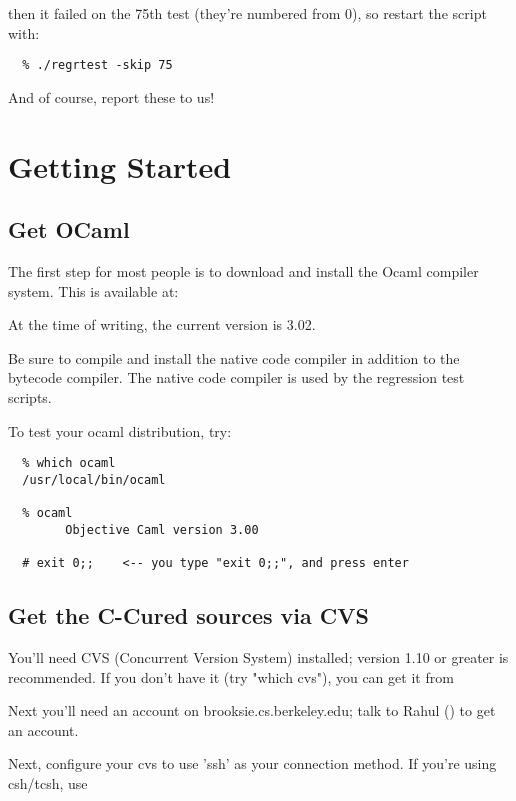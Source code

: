\documentclass{book}
\begin{document}
then it failed on the 75th test (they're numbered from 0), so restart
the script with:

\begin{verbatim}
  % ./regrtest -skip 75
\end{verbatim}

And of course, report these to us!

        \chapter{Getting Started}

\section{Get OCaml}

The first step for most people is to download and install the Ocaml
compiler system.  This is available at:


At the time of writing, the current version is 3.02.

Be sure to compile and install the native code compiler in addition
to the bytecode compiler.  The native code compiler is used by the
regression test scripts.

To test your ocaml distribution, try:

\begin{verbatim}
  % which ocaml
  /usr/local/bin/ocaml

  % ocaml
        Objective Caml version 3.00

  # exit 0;;    <-- you type "exit 0;;", and press enter
\end{verbatim}

\section{Get the C-Cured sources via CVS}

You'll need CVS (Concurrent Version System) installed; version 1.10 or
greater is recommended.  If you don't have it (try "which cvs"), you can
get it from


Next you'll need an account on brooksie.cs.berkeley.edu; talk to Rahul
() to get an account.

Next, configure your cvs to use 'ssh' as your connection method.  If you're
using csh/tcsh, use
\end{document}
